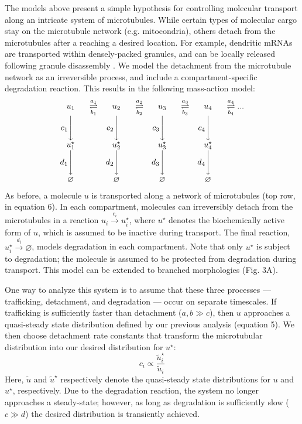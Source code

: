\documentclass[fleqn,10pt]{wlpeerj}
\begin{document}
The models above present a simple hypothesis for controlling molecular transport along an intricate system of microtubules. While certain types of molecular cargo stay on the microtubule network (e.g. mitocondria), others detach from the microtubules after a reaching a desired location. For example, dendritic mRNAs are transported within densely-packed granules, and can be locally released following granule disassembly \citep{Krichevsky_2001,Buxbaum_2014a}. We model the detachment from the microtubule network as an irreversible process, and include a compartment-specific degradation reaction. This results in the following mass-action model:
$$
\begin{array}{cccccccc}
u_1 & \overset{a_1}{\underset{b_1}{\rightleftharpoons}} &
u_2 & \overset{a_2}{\underset{b_2}{\rightleftharpoons}} &
u_3 & \overset{a_3}{\underset{b_3}{\rightleftharpoons}} &
u_4 & \overset{a_4}{\underset{b_4}{\rightleftharpoons}} ...
\\
c_1 \Bigg\downarrow \phantom{c_1} & &
c_2 \Bigg\downarrow \phantom{c_2} & &
c_3 \Bigg\downarrow \phantom{c_3} & &
c_4 \Bigg\downarrow \phantom{c_4} & 
\\
u_1^\star &  &
u_2^\star &  &
u_3^\star &  &
u_4^\star &   
\\
d_1 \Bigg\downarrow \phantom{d_1} & &
d_2 \Bigg\downarrow \phantom{d_2} & &
d_3 \Bigg\downarrow \phantom{d_3} & &
d_4 \Bigg\downarrow \phantom{d_4} & 
\\
\varnothing &  &
\varnothing &  &
\varnothing &  &
\varnothing &  
\end{array}
$$
As before, a molecule $u$ is transported along a network of microtubules (top row, in equation 6). In each compartment, molecules can irreversibly detach from the microtubules in a reaction $u_i \xrightarrow{c_i} u_i^\star$, where $u^\star$ denotes the biochemically active form of $u$, which is assumed to be inactive during transport. The final reaction, $u_i^\star \xrightarrow{d_i} \varnothing$, models degradation in each compartment. Note that only $u^\star$ is subject to degradation; the molecule is assumed to be protected from degradation during transport. This model can be extended to branched morphologies (Fig. 3A).

One way to analyze this system is to assume that these three processes --- trafficking, detachment, and degradation --- occur on separate timescales. If trafficking is sufficiently faster than detachment ($a,b \gg c$), then $u$ approaches a quasi-steady state distribution defined by our previous analysis (equation 5). We then choose detachment rate constants that transform the microtubular distribution into our desired distribution for $u^\star$:
$$
c_i \propto \frac{\tilde{u}^\star_i}{\tilde{u}_i}
$$
Here, $\tilde{u}$ and $\tilde{u}^\star$ respectively denote the quasi-steady state distributions for $u$ and $u^\star$, respectively. Due to the degradation reaction, the system no longer approaches a steady-state; however, as long as degradation is sufficiently slow ($c \gg d$) the desired distribution is transiently achieved.
\end{document}
